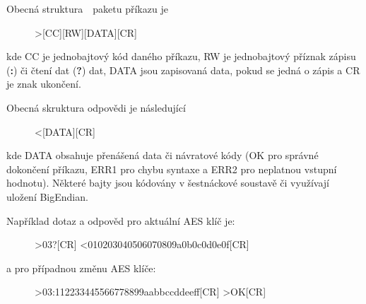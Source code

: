 \newpage
Obecná struktura~\cite{ModulIQRF}~paketu příkazu je 

\begin{figure}[!ht]
\begin{centerverbatim}
			>[CC][RW][DATA][CR]
\end{centerverbatim}
\end{figure}

kde CC je jednobajtový kód daného příkazu, RW je jednobajtový příznak zápisu (\textbf{:}) či čtení dat (\textbf{?}) dat, DATA jsou zapisovaná data, pokud se jedná o zápis a CR je znak ukončení.

Obecná skruktura odpovědi je následující

\begin{figure}[!ht]
\begin{centerverbatim}
	<[DATA][CR]
\end{centerverbatim}
\end{figure}

kde DATA obsahuje přenášená data či návratové kódy (OK pro správné dokončení příkazu, ERR1 pro chybu syntaxe a ERR2 pro neplatnou vstupní hodnotu). Některé bajty jsou kódovány v šestnáckové soustavě či využívají uložení BigEndian.

Například dotaz a odpověd pro aktuální AES klíč je:
\label{KapitolaStazeniKlice}

\begin{figure}[!ht]
\begin{centerverbatim}
	>03?[CR]
	<010203040506070809a0b0c0d0e0f[CR]  
\end{centerverbatim}
\end{figure}

a pro případnou změnu AES klíče:

\begin{figure}[!ht]
\begin{centerverbatim}
>03:112233445566778899aabbccddeeff[CR]
>OK[CR]
\end{centerverbatim}
\end{figure}




